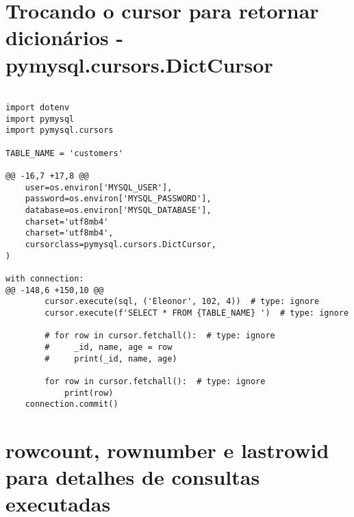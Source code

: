 \documentclass{article}
\begin{document}
    \section{Trocando o cursor para retornar dicionários - pymysql.cursors.DictCursor}
  
    \begin{lstlisting}
        
import dotenv
import pymysql
import pymysql.cursors

TABLE_NAME = 'customers'

@@ -16,7 +17,8 @@
    user=os.environ['MYSQL_USER'],
    password=os.environ['MYSQL_PASSWORD'],
    database=os.environ['MYSQL_DATABASE'],
    charset='utf8mb4'
    charset='utf8mb4',
    cursorclass=pymysql.cursors.DictCursor,
)

with connection:
@@ -148,6 +150,10 @@
        cursor.execute(sql, ('Eleonor', 102, 4))  # type: ignore
        cursor.execute(f'SELECT * FROM {TABLE_NAME} ')  # type: ignore

        # for row in cursor.fetchall():  # type: ignore
        #     _id, name, age = row
        #     print(_id, name, age)

        for row in cursor.fetchall():  # type: ignore
            print(row)
    connection.commit()
    \end{lstlisting}

    \section{rowcount, rownumber e lastrowid para detalhes de consultas executadas}
    
\end{document}
